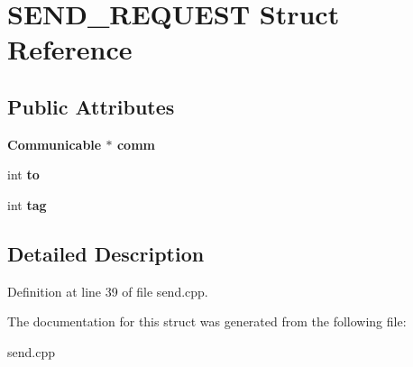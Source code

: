 \section{SEND\_\-REQUEST Struct Reference}
\label{struct_s_e_n_d___r_e_q_u_e_s_t}
\subsection*{Public Attributes}
\begin{CompactItemize}
\item 
\bf{Communicable} $\ast$ \bf{comm}\label{struct_s_e_n_d___r_e_q_u_e_s_t_1ad8f7233fa3ff13262e783a9153920f}

\item 
int \bf{to}\label{struct_s_e_n_d___r_e_q_u_e_s_t_93e2a6a71d2a91aa2b7bdd050ee59b4d}

\item 
int \bf{tag}\label{struct_s_e_n_d___r_e_q_u_e_s_t_3126b3ef9d6533d3086760e413a7f23f}

\end{CompactItemize}


\subsection{Detailed Description}




Definition at line 39 of file send.cpp.

The documentation for this struct was generated from the following file:\begin{CompactItemize}
\item 
send.cpp\end{CompactItemize}
